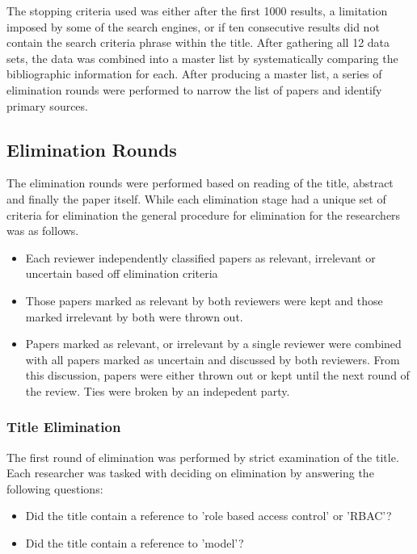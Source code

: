 The stopping criteria used was either after the first 1000 results, a limitation imposed by some of the search engines, or if ten consecutive results did not contain the search criteria phrase within the title.  After gathering all 12 data sets, the data was combined into a master list by systematically comparing the bibliographic information for each.  After producing a master list, a series of elimination rounds were performed to narrow the list of papers and identify primary sources.

\subsection{Elimination Rounds}

The elimination rounds were performed based on reading of the title, abstract and finally the paper itself.  While each elimination stage had a unique set of criteria for elimination the general procedure for elimination for the researchers was as follows.

\begin{itemize}
\item Each reviewer independently classified papers as relevant, irrelevant or uncertain based off elimination criteria
\item Those papers marked as relevant by both reviewers were kept and those marked irrelevant by both were thrown out.
\item Papers marked as relevant, or irrelevant by a single reviewer were combined with all papers marked as uncertain and discussed by both reviewers.  From this discussion, papers were either thrown out or kept until the next round of the review.  Ties were broken by an indepedent party.
\end{itemize}

\subsubsection{Title Elimination}

The first round of elimination was performed by strict examination of the title.  Each researcher was tasked with deciding on elimination by answering the following questions:

\begin{itemize}
\item Did the title contain a reference to 'role based access control' or 'RBAC'? 
\item Did the title contain a reference to 'model'?
\end{itemize}

